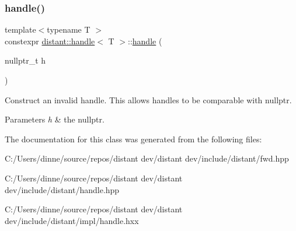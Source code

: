 \subsubsection{\texorpdfstring{handle()}{handle()}\hspace{0.1cm}{\footnotesize\ttfamily [2/2]}}
{\footnotesize\ttfamily template$<$typename T $>$ \\
constexpr \mbox{\hyperlink{classdistant_1_1handle}{distant\+::handle}}$<$ T $>$\+::\mbox{\hyperlink{classdistant_1_1handle}{handle}} (\begin{DoxyParamCaption}\item[{nullptr\+\_\+t}]{h }\end{DoxyParamCaption})\hspace{0.3cm}{\ttfamily [noexcept]}}

Construct an invalid handle. This allows handles to be comparable with nullptr. 
\begin{DoxyParams}{Parameters}
{\em h} & the nullptr. \\
\hline
\end{DoxyParams}


The documentation for this class was generated from the following files\+:\begin{DoxyCompactItemize}
\item 
C\+:/\+Users/dinne/source/repos/distant dev/distant dev/include/distant/fwd.\+hpp\item 
C\+:/\+Users/dinne/source/repos/distant dev/distant dev/include/distant/handle.\+hpp\item 
C\+:/\+Users/dinne/source/repos/distant dev/distant dev/include/distant/impl/handle.\+hxx\end{DoxyCompactItemize}
